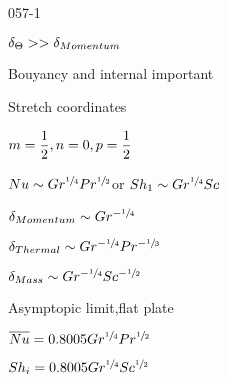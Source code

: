 \begin{mitframe}{057-1}
 \begin{listone}
	\item $\blthick_{\dimltemp}>>\blthick_{Momentum}$
    \item Bouyancy and internal important
    \item Stretch coordinates
    		\begin{listtwo}
            	\item $\mass=\dfrac{1}{2}, n=0, p=\dfrac{1}{2}$
            \end{listtwo}
\item $\nusselt\sim\grashof^{\sfrac{1}{4}}\prandtl^{\sfrac{1}{2}}$or $\sherwood_1\sim\grashof^{\sfrac{1}{4}}\schmidt$
\item $\blthick_{Momentum}\sim\grashof^{-\sfrac{1}{4}}$
\item $\blthick_{Thermal}\sim\grashof^{-\sfrac{1}{4}}\prandtl^{-\sfrac{1}{3}}$
\item $\blthick_{Mass}\sim\grashof^{-\sfrac{1}{4}}\schmidt^{-\sfrac{1}{2}}$
\item Asymptopic limit,flat plate
\item $\overline{\nusselt}=0.8005\grashof^{\sfrac{1}{4}}\prandtl^{\sfrac{1}{2}}$
\item $\sherwood_{\state}=0.8005\grashof^{\sfrac{1}{4}}\schmidt^{\sfrac{1}{2}}$
\end{listone}
\end{mitframe}